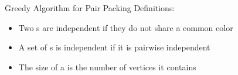 \begin{frame}{Greedy Algorithm for Pair Packing}
Definitions:
\begin{itemize}
\pause\item
Two \pack{}s are \alert{independent} if they do not share a common color

\pause\item
A set of \pack{}s is independent if it is pairwise independent

\pause\item
The size of a \pack{} is the number of vertices it contains
\end{itemize}
\end{frame}